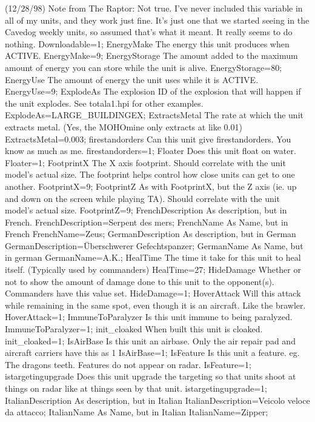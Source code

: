 \documentclass[a4paper,10pt]{article}
\begin{document}
(12/28/98)  Note from The Raptor:  Not true. I've never included this variable in all of my units, and they work just fine. It's just one that we started seeing in the Cavedog weekly units, so assumed that's what it meant. It really seems to do nothing.
	Downloadable=1;
EnergyMake 	The energy this unit produces when ACTIVE. 	EnergyMake=9;
EnergyStorage 	The amount added to the maximum amount of energy you can store while the unit is alive. 	EnergyStorage=80;
EnergyUse 	The amount of energy the unit uses while it is ACTIVE. 	EnergyUse=9;
ExplodeAs 	The explosion ID of the explosion that will happen if the unit explodes. See totala1.hpi for other examples. 	ExplodeAs=LARGE\_BUILDINGEX;
ExtractsMetal 	The rate at which the unit extracts metal. (Yes, the MOHOmine only extracts at like 0.01) 	ExtractsMetal=0.003;
firestandorders 	Can this unit give firestandorders. You know as much as me. 	firestandorders=1;
Floater 	Does this unit float on water. 	Floater=1;
FootprintX 	The X axis footprint.  Should correlate with the unit model's actual size.  The footprint helps control how close units can get to one another. 	FootprintX=9;
FootprintZ 	As with FootprintX, but the Z axis (ie. up and down on the screen while playing TA).  Should correlate with the unit model's actual size. 	FootprintZ=9;
FrenchDescription 	As description, but in French. 	FrenchDescription=Serpent des mers;
FrenchName 	As Name, but in French 	FrenchName=Zeus;
GermanDescription 	As description, but in German 	GermanDescription=Überschwerer Gefechtspanzer;
GermanName 	As Name, but in german 	GermanName=A.K.;
HealTime 	The time it take for this unit to heal itself.   (Typically used by commanders) 	HealTime=27;
HideDamage 	Whether or not to show the amount of damage done to this unit to the opponent(s).  Commanders have this value set. 	HideDamage=1;
HoverAttack 	Will this attack while remaining in the same spot, even though it is an aircraft. Like the brawler. 	HoverAttack=1;
ImmuneToParalyzer 	Is this unit immune to being paralyzed. 	ImmuneToParalyzer=1;
init\_cloaked 	When built this unit is cloaked. 	init\_cloaked=1;
IsAirBase 	Is this unit an airbase. Only the air repair pad and aircraft carriers have this as 1 	IsAirBase=1;
IsFeature 	Is this unit a feature. eg. The dragons teeth.   Features do not appear on radar. 	IsFeature=1;
istargetingupgrade 	Does this unit upgrade the targeting so that units shoot at things on radar like at things seen by that unit. 	istargetingupgrade=1;
ItalianDescription 	As description, but in Italian 	ItalianDescription=Veicolo veloce da attacco;
ItalianName 	As Name, but in Italian 	ItalianName=Zipper;
\end{document}
